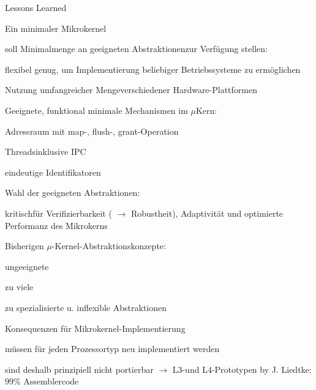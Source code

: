 \documentclass[a4paper]{article}
\begin{document}
\begin{multicols}{3}
    Lessons Learned

    \begin{enumerate*}
        \item
        Ein minimaler Mikrokernel
        \begin{itemize*}
            \item soll Minimalmenge an geeigneten Abstraktionenzur Verfügung stellen:
            \item flexibel genug, um Implementierung beliebiger Betriebssysteme zu ermöglichen
            \item Nutzung umfangreicher Mengeverschiedener Hardware-Plattformen
        \end{itemize*}
        \item
        Geeignete, funktional minimale Mechanismen im $\mu$Kern:
        \begin{itemize*}
            \item Adressraum mit map-, flush-, grant-Operation
            \item Threadsinklusive IPC
            \item eindeutige Identifikatoren
        \end{itemize*}
        \item
        Wahl der geeigneten Abstraktionen:
        \begin{itemize*}
            \item kritischfür Verifizierbarkeit ( $\rightarrow$ Robustheit), Adaptivität und optimierte Performanz des Mikrokerns
        \end{itemize*}
        \item
        Bisherigen $\mu$-Kernel-Abstraktionskonzepte:
        \begin{enumerate*}
            \def\labelenumii{\arabic{enumii}.}
            \item ungeeignete
            \item zu viele
            \item zu spezialisierte u. inflexible Abstraktionen
        \end{enumerate*}
        \item
        Konsequenzen für Mikrokernel-Implementierung
        \begin{itemize*}
            \item müssen für jeden Prozessortyp neu implementiert werden
            \item sind deshalb prinzipiell nicht portierbar $\rightarrow$ L3-und L4-Prototypen by J. Liedtke: 99\% Assemblercode

\end{itemize*}
\end{enumerate*}
\end{multicols}
\end{document}
